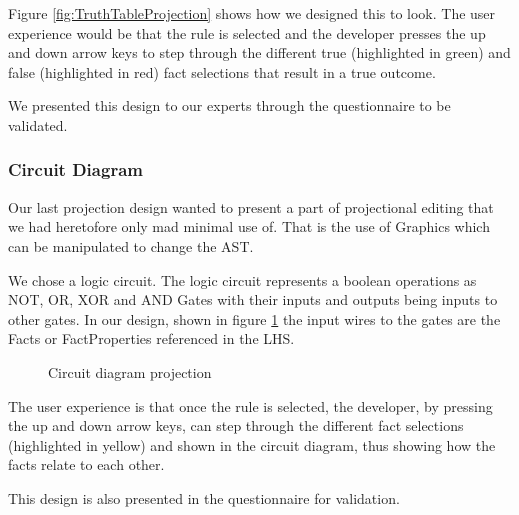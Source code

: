 Figure \ref{fig:TruthTableProjection} shows how we designed this to look.
The user experience would be that the rule is selected and the developer presses the up and down arrow keys to step through the different true (highlighted in green) and false (highlighted in red) fact selections that result in a true outcome.

We presented this design to our experts through the questionnaire to be validated.

\subsubsection{Circuit Diagram}
Our last projection design wanted to present a part of projectional editing that we had heretofore only mad minimal use of.
That is the use of Graphics which can be manipulated to change the AST.

We chose a logic circuit. The logic circuit represents a boolean operations as NOT, OR, XOR and AND Gates with their inputs and outputs being inputs to other gates.
In our design, shown in figure \ref{fig:CircuitDiagramProjection} the input wires to the gates are the Facts or FactProperties referenced in the LHS.

\begin{figure}[h]
    \centering
    \caption{Circuit diagram projection}
    \label{fig:CircuitDiagramProjection}
\end{figure}

The user experience is that once the rule is selected, the developer, by pressing the up and down arrow keys, can step through the different fact selections (highlighted in yellow) and shown in the circuit diagram, thus showing how the facts relate to each other.

This design is also presented in the questionnaire for validation.

